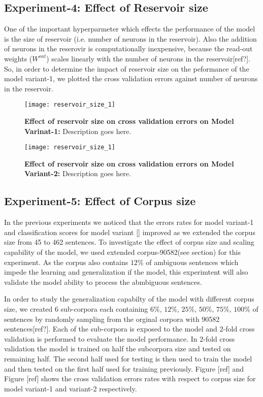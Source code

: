 \subsection{Experiment-4: Effect of Reservoir size}

One of the important hyperparmeter which effects the performance of the model is the size of reservoir (i.e. number of neurons in the reservoir). Also the addition of neurons in the reserovir is computationally inexpensive, because the read-out weights ($W^{out}$) scales linearly with the number of neurons in the reservoir[ref?]. So, in order to determine the impact of reservoir size on the peformance of the model variant-1, we plotted the cross validation errors against number of neurons in the reservoir.

\begin{figure}[hbtp]
\centering
\texttt{[image: reservoir\_size\_1]}
\caption{\textbf{Effect of reservoir size on cross validation errors on Model Varinat-1:} Description goes here.}
\label{fig:sem_rel}
\end{figure}

\begin{figure}[hbtp]
\centering
\texttt{[image: reservoir\_size\_1]}
\caption{\textbf{Effect of reservoir size on cross validation errors on Model Variant-2:} Description goes here.}
\label{fig:sem_rel}
\end{figure}


\subsection{Experiment-5: Effect of Corpus size}

In the previous experiments we noticed that the errors rates for model variant-1 and classification scores for model variant [] improved as we extended the corpus size from 45 to 462 sentences. To investigate the effect of corpus size and scaling capability of the model, we used extended corpus-90582(see section) for this experiment. As the corpus also contains $12\%$ of ambiguous sentences which impede the learning and generalization if the model, this experimtent will also validate the model ability to process the abmbiguous sentences.

In order to study the generalization capabilty of the model with different corpus size, we created 6 sub-corpora each containing $6\%$, $12\%$, $25\%$, $50\%$, $75\%$, $100\%$ of sentences by randomly sampling from the orginal corpora with 90582 sentences[ref?]. Each of the sub-corpora is exposed to the model and 2-fold cross validation is performed to evaluate the model performance. In 2-fold cross validation the model is trained on half the subcorpora size and tested on remaining half. The second half used for testing is then used to train the model and then tested on the first half used for training previously. Figure [ref] and Figure [ref] shows the cross validation errors rates with respect to corpus size for model variant-1 and variant-2 respectively.

